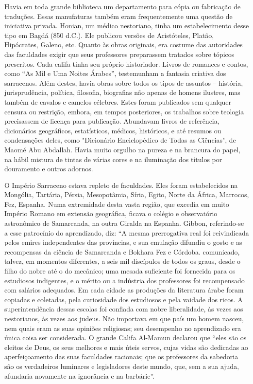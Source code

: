 \documentclass[11pt,a5paper,twoside,openany]{book}
\begin{document}
Havia em toda grande biblioteca um departamento para cópia ou fabricação de traduções. Essas manufaturas também eram frequentemente uma questão de iniciativa privada. Honian, um médico nestoriano, tinha um estabelecimento desse tipo em Bagdá (850 d.C.). Ele publicou versões de Aristóteles, Platão, Hipócrates, Galeno, etc. Quanto às obras originais, era costume das autoridades das faculdades exigir que seus professores preparassem tratados sobre tópicos prescritos. Cada califa tinha seu próprio historiador. Livros de romances e contos, como “As Mil e Uma Noites Árabes”, testemunham a fantasia criativa dos sarracenos. Além destes, havia obras sobre todos os tipos de assuntos – história, jurisprudência, política, filosofia, biografias não apenas de homens ilustres, mas também de cavalos e camelos célebres. Estes foram publicados sem qualquer censura ou restrição, embora, em tempos posteriores, os trabalhos sobre teologia precisassem de licença para publicação. Abundavam livros de referência, dicionários geográficos, estatísticos, médicos, históricos, e até resumos ou condensações deles, como "Dicionário Enciclopédico de Todas as Ciências", de Maomé Abu Abdallah. Havia muito orgulho na pureza e na brancura do papel, na hábil mistura de tintas de várias cores e na iluminação dos títulos por douramento e outros adornos.

O Império Sarraceno estava repleto de faculdades. Eles foram estabelecidos na Mongólia, Tartária, Pérsia, Mesopotâmia, Síria, Egito, Norte da África, Marrocos, Fez, Espanha. Numa extremidade desta vasta região, que excedia em muito Império Romano em extensão geográfica, ficava o colégio e observatório astronômico de Samarcanda, na outra Giralda na Espanha. Gibbon, referindo-se a esse patrocínio do aprendizado, diz: “A mesma prerrogativa real foi reivindicada pelos emires independentes das províncias, e sua emulação difundiu o gosto e as recompensas da ciência de Samarcanda e Bokhara Fez e Córdoba. comunicado, talvez, em momentos diferentes, a seis mil discípulos de todos os graus, desde o filho do nobre até o do mecânico; uma mesada suficiente foi fornecida para os estudiosos indigentes, e o mérito ou a indústria dos professores foi recompensado com salários adequados. Em cada cidade as produções da literatura árabe foram copiadas e coletadas, pela curiosidade dos estudiosos e pela vaidade dos ricos. A superintendência dessas escolas foi confiada com nobre liberalidade, às vezes aos nestorianos, às vezes aos judeus. Não importava em que país um homem nasceu, nem quais eram as suas opiniões religiosas; seu desempenho no aprendizado era única coisa ser considerada. O grande Califa Al-Mamun declarou que “eles são os eleitos de Deus, os seus melhores e mais úteis servos, cujas vidas são dedicadas ao aperfeiçoamento das suas faculdades racionais; que os professores da sabedoria são os verdadeiros luminares e legisladores deste mundo, que, sem a sua ajuda, afundaria novamente na ignorância e na barbárie”.
\end{document}

